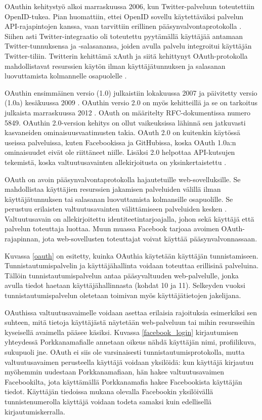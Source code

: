 OAuthin kehitystyö alkoi marraskuussa 2006, kun Twitter-pal\-ve\-luun toteutettiin \mbox{OpenID-tukea}. Pian huomattiin, ettei OpenID sovellu käytettäväksi palvelun API-ra\-ja\-pin\-to\-jen kanssa, vaan tarvittiin erillinen pääsynvalvontaprotokolla \cite{oauth_primer}. Siihen asti Twitter-integraatio oli toteutettu pyytämällä käyttäjää antamaan Twitter-tun\-nuk\-sen\-sa ja -salasanansa, joiden avulla palvelu integroitui käyttäjän Twitter-tiliin. Twitterin kehittämä xAuth ja siitä kehittynyt OAuth-protokolla mahdollistavat resurssien käytön ilman käyttäjätunnuksen ja salasanan luovuttamista kolmannelle osapuolelle \cite{oauth2_0}.

OAuthin ensimmäinen versio (1.0) julkaistiin lokakuussa 2007 ja päivitetty versio (1.0a) kesäkuussa 2009 \cite{oauth2_0}. OAuthin versio 2.0 on myös kehitteillä ja se on tarkoitus julkaista marraskuussa 2012 \cite{oauth2_0}. OAuth on määritelty RFC-dokumentissa numero 5849. OAuthin 2.0-version kehitys on ollut vaikeuksissa lähinnä sen jatkuvasti kasvaneiden ominaisuusvaatimusten takia. OAuth 2.0 on kuitenkin käytössä useissa palveluissa, kuten Facebookissa ja GitHubissa, koska OAuth 1.0a:n ominaisuudet eivät ole riittäneet niille. Lisäksi 2.0 helpottaa API-kutsujen tekemistä, koska valtuutusavainten allekirjoitusta on yksinkertaistettu \cite{oauth2_0}.

OAuth on avoin pääsynvalvontaprotokolla hajautetuille web-sovelluksille. Se mahdollistaa käyttäjien resurssien jakamisen palveluiden välillä ilman käyttäjätunnuksen tai salasanan luovuttamista kolmansille osapuolille. Se perustuu erilaisten valtuutusavainten välittämiseen palveluiden kesken \cite{oauth2_0}. Valtuutusavain on allekirjoitettu identiteetintarjoajalla, johon sekä käyttäjä että palvelun toteuttaja luottaa. Muun muassa Facebook tarjoaa avoimen OAuth-rajapinnan, jota web-sovellusten toteuttajat voivat käyttää pääsynvalvonnassaan.

Kuvassa \ref{oauth} on esitetty, kuinka OAuthia käytetään käyttäjän tunnistamiseen. Tunnistautumispalvelin ja käyttäjähallinta voidaan toteuttaa erillisinä palveluina. Tällöin tunnistautumispalvelun antaa pääsyvaltuuden web-palvelulle, jonka avulla tiedot haetaan käyttäjähallinnasta (kohdat 10 ja 11). Selkeyden vuoksi tunnistautumispalvelun oletetaan toimivan myös käyttäjätietojen jakelijana.

OAuthissa valtuutusavaimelle voidaan asettaa erilaisia rajoituksia esimerkiksi sen suhteen, mitä tietoja käyttäjästä näytetään web-palveluun tai mihin resursseihin kyseisellä avaimella pääsee käsiksi. Kuvassa \ref{facebook_login} kirjautumisen yhteydessä Porkkanamafialle annetaan oikeus nähdä käyttäjän nimi, profiilikuva, sukupuoli jne. OAuth ei siis ole varsinaisesti tunnistautumisprotokolla, mutta valtuutusavaimen perusteella käyttäjä voidaan yksilöidä: kun käyttäjä kirjautuu myöhemmin uudestaan Porkkanamafiaan, hän hakee valtuutusavaimen Facebookilta, jota käyttämällä Porkkanamafia hakee Facebookista käyttäjän tiedot. Käyttäjän tiedoissa mukana olevalla Facebookin yksilöivällä tunnistenumerolla käyttäjä voidaan todeta samaksi kuin edellisellä kirjautumiskerralla.

